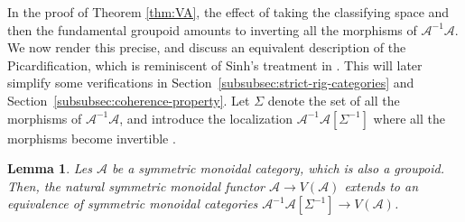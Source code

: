 \documentclass[11pt]{article}
\theoremstyle{plain}
\newtheorem{lemma}[theorem]{Lemma}
\theoremstyle{definition}
\newcommand{\Acal}{\mathcal A}
\begin{document}
In the proof of Theorem \ref{thm:VA}, the effect of taking the classifying space and then the fundamental groupoid amounts to inverting all the morphisms of $\Acal^{-1}\Acal$. We now render this precise, and discuss an equivalent description of the Picardification, which is reminiscent of Sinh's treatment in \cite[Chap.\,III]{Sinh-these}. This will later simplify some verifications in Section~\ref{subsubsec:strict-rig-categories} and Section~\ref{subsubsec:coherence-property}. Let $\Sigma$ denote the set of all the morphisms of $\Acal^{-1}\Acal$, and introduce the localization $\Acal^{-1}\Acal[\Sigma^{-1}]$ where all the morphisms become invertible \cite[Chap.\,I]{Gabriel-Zisman}.
\begin{lemma}\label{lemma:VA-tilde}
Les $\Acal$ be a symmetric monoidal category, which is also a groupoid. Then, the natural symmetric monoidal functor $\Acal\to V(\Acal)$ extends to an equivalence of symmetric monoidal categories $\Acal^{-1}\Acal[\Sigma^{-1}]\to V(\Acal)$.
\end{lemma}
\end{document}
